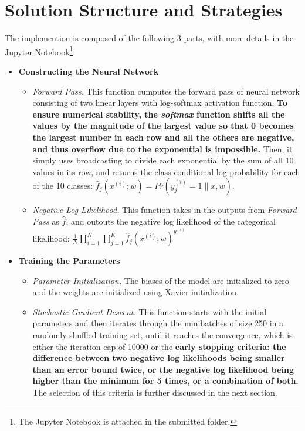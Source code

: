 \documentclass{article} %
\begin{document}
\vspace{0.3cm}
\section*{Solution Structure and Strategies} %
The implemention is composed of the following 3 parts, with more details in the Jupyter Notebook\footnote{The Jupyter Notebook is attached in the submitted folder.}:
\begin{itemize}
  \item \textbf{Constructing the Neural Network}
    \begin{itemize}
    \item \textit{Forward Pass.} This function cumputes the forward pass of neural network consisting of two linear layers with log-softmax activation function. \textbf{To ensure numerical stability, the \textit{softmax} function shifts all the values by the magnitude of the largest value so that 0 becomes the largest number in each row and all the others are negative, and thus overflow due to the exponential is impossible.} Then, it simply uses broadcasting to divide each exponential by the sum of all 10 values in its row, and returns the class-conditional log probability for each of the 10 classes: $\hat f_j (x^{(i)}; w) = Pr(y^{(i)}_j=1\| x, w)$.

    \item \textit{Negative Log Likelihood.} This function takes in the outputs from \textit{Forward Pass} as $ \hat f$, and outouts the negative log likelihood of the categorical likelihood: $\frac{1}{N}\prod_{i=1}^N \prod_{j=1}^K \hat f_j (x^{(i)}; w)^{y^{(i)}}$
    \end{itemize}

  \item \textbf{Training the Parameters}
  \begin{itemize}
    \item \textit{Parameter Initialization.} The biases of the model are initialized to zero and the weights are initialized using Xavier initialization.

    \item \textit{Stochastic Gradient Descent.} This function starts with the initial parameters and then iterates through the minibatches of size 250 in a randomly shuffled training set, until it reaches the convergence, which is either the iteration cap of 10000 or the \textbf{early stopping criteria: the difference between two negative log likelihoods being smaller than an error bound twice, or the negative log likelihood being higher than the minimum for 5 times, or a combination of both.} The selection of this criteria is further discussed in the next section.
  \end{itemize}


\end{itemize}
\end{document}
